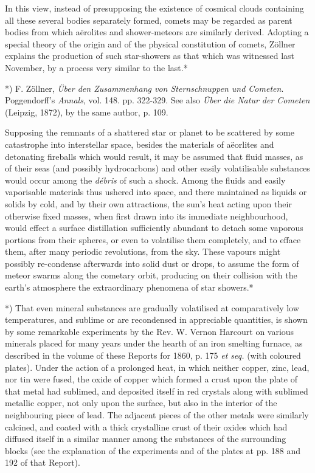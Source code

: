 \documentclass[a4paper, 12pt, oneside, polutonikogreek, english]{article}
\begin{document}
In this view, instead of presupposing the existence of cosmical clouds containing all these several bodies separately formed, comets may be regarded as parent bodies from which aërolites and shower-meteors are similarly derived. Adopting a special theory of the origin and of the physical constitution of comets, Zöllner explains the production of such star-showers as that which was witnessed last November, by a process very similar to the last.*

*) F. Zöllner, \emph{Über den Zusammenhang von Sternschnuppen und Cometen}. Poggendorff's \emph{Annals}, vol. 148. pp. 322-329. See also \emph{Über die Natur der Cometen} (Leipzig, 1872), by the same author, p. 109.

Supposing the remnants of a shattered star or planet to be scattered by some catastrophe into interstellar space, besides the materials of aëorlites and detonating fireballs which would result, it may be assumed that fluid masses, as of their seas (and possibly hydrocarbons) and other easily volatilisable substances would occur among the \emph{débris} of such a shock. Among the fluids and easily vaporisable materials thus ushered into space, and there maintained as liquids or solids by cold, and by their own attractions, the sun's heat acting upon their otherwise fixed masses, when first drawn into its immediate neighbourhood, would effect a surface distillation sufficiently abundant to detach some vaporous portions from their spheres, or even to volatilise them completely, and to efface them, after many periodic revolutions, from the sky. These vapours might possibly re-condense afterwards into solid dust or drops, to assume the form of meteor swarms along the cometary orbit, producing on their collision with the earth's atmosphere the extraordinary phenomena of star showers.*

*) That even mineral substances are gradually volatilised at comparatively low temperatures, and sublime or are recondensed in appreciable quantities, is shown by some remarkable experiments by the Rev. W. Vernon Harcourt on various minerals placed for many years under the hearth of an iron smelting furnace, as described in the volume of these Reports for 1860, p. 175 \emph{et seq.} (with coloured plates). Under the action of a prolonged heat, in which neither copper, zinc, lead, nor tin were fused, the oxide of copper which formed a crust upon the plate of that metal had sublimed, and deposited itself in red crystals along with sublimed metallic copper, not only upon the surface, but also in the interior of the neighbouring piece of lead. The adjacent pieces of the other metals were similarly calcined, and coated with a thick crystalline crust of their oxides which had diffused itself in a similar manner among the substances of the surrounding blocks (see the explanation of the experiments and of the plates at pp. 188 and 192 of that Report).
\end{document}
